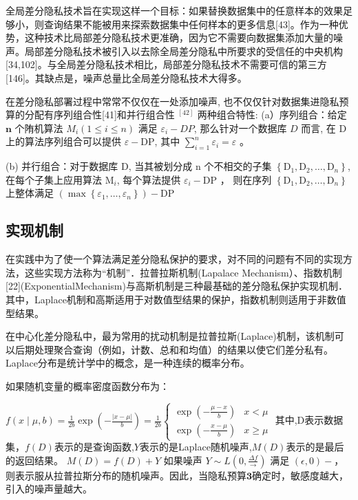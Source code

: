 全局差分隐私技术旨在实现这样一个目标：如果替换数据集中的任意样本的效果足够小，则查询结果不能被用来探索数据集中任何样本的更多信息[43]。作为一种优势，这种技术比局部差分隐私技术更准确，因为它不需要向数据集添加大量的噪声。局部差分隐私技术被引入以去除全局差分隐私中所要求的受信任的中央机构[34,102]。与全局差分隐私技术相比，局部差分隐私技术不需要可信的第三方[146]。其缺点是，噪声总量比全局差分隐私技术大得多。

\begin{define}[组合定理]\label{组合定理}
在差分隐私部署过程中常常不仅仅在一处添加噪声, 也不仅仅针对数据集进隐私预算的分配有序列组合性[41]和并行组合性 ${ }^{[42]}$ 两种组合特性:
(a）序列组合：给定 $\mathbf{n}$ 个陏机算法 $M_{i}(1 \leq i \leq n)$ 满足 $\varepsilon_{i}-DP$, 那么针对一个数据库 $D$ 而言, 在 $\mathrm{D}$ 上的算法序列组合可以提供 $\varepsilon-\mathrm{DP}$, 其中 $\sum_{i=1}^{n} \varepsilon_{i}=\varepsilon$ 。

(b) 并行组合：对于数据库 $\mathrm{D}$, 当其被划分成 $\mathrm{n}$ 个不相交的子集 $\left\{\mathrm{D}_{1}, \mathrm{D}_{2}, \ldots, \mathrm{D}_{n}\right\}$, 在每个子集上应用算法 $\mathrm{M}_{i}$, 每个算法提供 $\varepsilon_{i}-\mathrm{DP}$ ， 则在序列 $\left\{\mathrm{D}_{1}, \mathrm{D}_{2}, \ldots, \mathrm{D}_{n}\right\}$ 上整体满足 $\left(\max \left\{\varepsilon_{1}, \ldots, \varepsilon_{n}\right\}\right)-\mathrm{DP}$
\end{define}


\subsection{实现机制}
在实践中为了使一个算法满足差分隐私保护的要求，对不同的问题有不同的实现方法，这些实现方法称为“机制”．拉普拉斯机制(Lapalace Mechanism）、指数机制[22](ExponentialMechanism)与高斯机制是三种最基础的差分隐私保护实现机制．其中，Laplace机制和高斯适用于对数值型结果的保护，指数机制则适用于非数值型结果。

在中心化差分隐私中，最为常用的扰动机制是拉普拉斯(Laplace)机制，该机制可以后期处理聚合查询（例如，计数、总和和均值）的结果以使它们差分私有。
Laplace分布是统计学中的概念，是一种连续的概率分布。
\begin{define}[拉普拉斯机制]\label{拉普拉斯机制}
如果随机变量的概率密度函数分布为：

$f(x \mid \mu, b)=\frac{1}{2 b} \exp \left(-\frac{|x-\mu|}{b}\right)=\frac{1}{2 b}\left\{\begin{array}{ll}\exp \left(-\frac{\mu-x}{b}\right) & x<\mu \\ \exp \left(-\frac{x-\mu}{b}\right) & x \geq \mu\end{array}\right.$
其中,D表示数据集，$f(D)$表示的是查询函数,$Y$表示的是Laplace随机噪声,$M(D)$表示的是最后的返回结果。
$M(D)=f(D)+Y$
如果噪声 $Y \sim L\left(0, \frac{\Delta f}{\longrightarrow}\right)$ 满足 $(\epsilon, 0)-$，则表示服从拉普拉斯分布的随机噪声。因此，当隐私预算$\mathbf{3}$确定时，敏感度越大，引入的噪声量越大。
\end{define}


